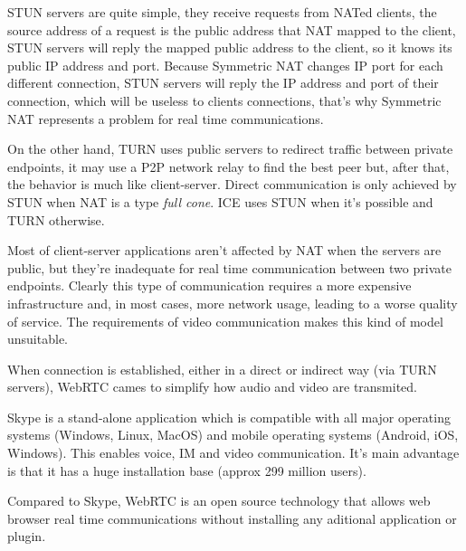 \ac{STUN} servers are quite simple, they receive requests from \ac{NAT}ed clients, the source address of a request is the public address that \ac{NAT} mapped to the client, \ac{STUN} servers will reply the mapped public address to the client, so it knows its public \ac{IP} address and port. Because Symmetric \ac{NAT} changes \ac{IP} port for each different connection, \ac{STUN} servers will reply the \ac{IP} address and port of their connection, which will be useless to clients connections, that's why Symmetric \ac{NAT} represents a problem for real time communications.   

On the other hand, \ac{TURN} uses public servers to redirect traffic between private endpoints, it may use a P2P network relay to find the best peer but, after that, the behavior is much like client-server. Direct communication is only achieved by \ac{STUN} when \ac{NAT} is a type \textit{full cone}. \ac{ICE} uses \ac{STUN} when it's possible and \ac{TURN} otherwise.

Most of client-server applications aren't affected by \ac{NAT} when the servers are public, but they're inadequate for real time communication between two private endpoints. Clearly this type of communication requires a more expensive infrastructure and, in most cases, more network usage, leading to a worse quality of service. The requirements of video communication makes this kind of model unsuitable.

When connection is established, either in a direct or indirect way (via \ac{TURN} servers), \ac{WebRTC} cames to simplify how audio and video are transmited.

{\color{blue}Skype is a stand-alone application which is compatible with all major operating systems (Windows, Linux, MacOS) and mobile operating systems (Android, iOS, Windows). This enables voice, IM and video communication. It's main advantage is that it has a huge installation base (approx 299 million users).}

Compared to Skype, \ac{WebRTC} is an open source technology that allows web browser real time communications without installing any aditional application or plugin.
